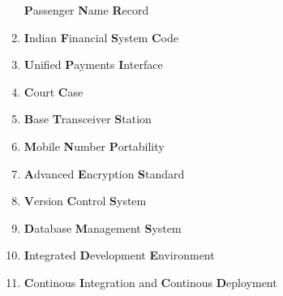 \begin{enumerate}
    \textbf{P}assenger \textbf{N}ame \textbf{R}ecord
    \item[]  \fontsize{14}{16}\selectfont 
    \textbf{I}ndian \textbf{F}inancial \textbf{S}ystem \textbf{C}ode
    \item[]  \fontsize{14}{16}\selectfont 
    \textbf{U}nified \textbf{P}ayments \textbf{I}nterface
    \item[]  \fontsize{14}{16}\selectfont 
    \textbf{C}ourt \textbf{C}ase
    \item[]  \fontsize{14}{16}\selectfont 
    \textbf{B}ase \textbf{T}ransceiver \textbf{S}tation
    \item[]  \fontsize{14}{16}\selectfont 
    \textbf{M}obile \textbf{N}umber \textbf{P}ortability
    \item[]  \fontsize{14}{16}\selectfont 
    \textbf{A}dvanced \textbf{E}ncryption \textbf{S}tandard
    \item[]  \fontsize{14}{16}\selectfont 
    \textbf{V}ersion \textbf{C}ontrol \textbf{S}ystem
    \item[]  \fontsize{14}{16}\selectfont 
    \textbf{D}atabase \textbf{M}anagement \textbf{S}ystem
    \item[]  \fontsize{14}{16}\selectfont 
    \textbf{I}ntegrated \textbf{D}evelopment \textbf{E}nvironment
    \item[]  \fontsize{14}{16}\selectfont 
    \textbf{C}ontinous \textbf{I}ntegration and \textbf{C}ontinous \textbf{D}eployment 
\end{enumerate}